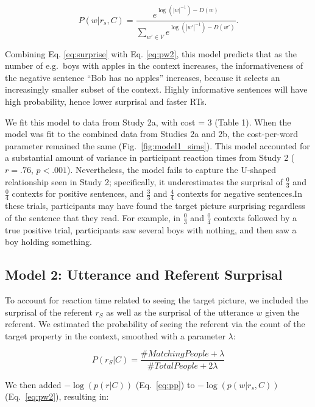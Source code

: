 \documentclass[10pt,letterpaper]{article}
\begin{document}
\begin{equation}\label{eq:pw2}
P(w | r_s, C) = \frac{ e^{\log(|w|^{-1}) - D(w)}} {\sum_{w' \in V}{e^{\log(|w'|^{-1}) - D(w')}}}.
\end{equation}

\noindent Combining Eq. \ref{eq:surprise} with Eq. \ref{eq:pw2}, this model predicts that as the number of e.g.\ boys with apples in the context increases, the informativeness of the negative sentence ``Bob has no apples'' increases, because it selects an increasingly smaller subset of the context. Highly informative sentences will have high probability, hence lower surprisal and faster RTs. 

We fit this model to data from Study 2a, with cost = 3 (Table 1).  When the model was fit to the combined data from Studies 2a and 2b, the cost-per-word parameter remained the same (Fig.\ \ref{fig:model1_sims}).  This model accounted for a substantial amount of variance in participant reaction times from Study 2 ($r=.76$, $p<.001$).  Nevertheless, the model fails to capture the U-shaped relationship seen in Study 2; specifically, it underestimates the surprisal of $\frac{0}{3}$ and $\frac{0}{4}$ contexts for positive sentences, and $\frac{3}{3}$ and $\frac{4}{4}$ contexts for negative sentences.In these trials, participants may have found the target picture surprising regardless of the sentence that they read. For example, in $\frac{0}{3}$ and $\frac{0}{4}$ contexts followed by a true positive trial, participants saw several boys with nothing, and then saw a boy holding something.  

\subsection{Model 2: Utterance and Referent Surprisal}

To account for reaction time related to seeing the target picture, we included the surprisal of the referent $r_S$ as well as the surprisal of the utterance $w$ given the referent. We estimated the probability of seeing the referent via the count of the target property in the context, smoothed with a parameter $\lambda$:

\begin{equation}\label{eq:pp}
P(r_S | C) =  \frac{\# Matching People  + \lambda}{\# Total People + 2\lambda}
\end{equation}

We then added $-\log(p(r|C))$ (Eq.\ \ref{eq:pp}) to $-\log(p(w|r_s,C))$ (Eq.\ \ref{eq:pw2}), resulting in:
\end{document}
